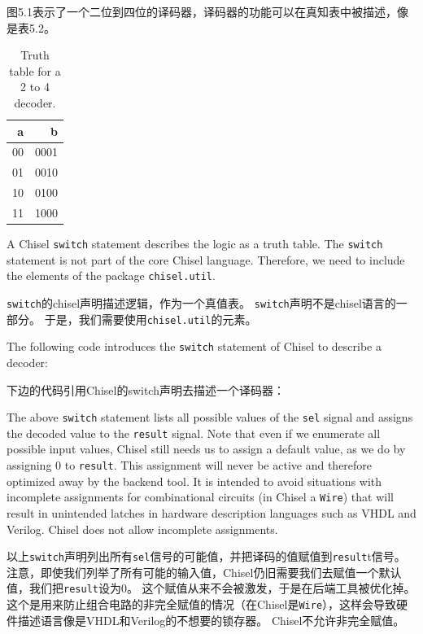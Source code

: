 \documentclass[%
    10pt,
    headinclude, footexclude,
    openright, %
    notitlepage,
    cleardoubleempty,
    headsepline,
    pointlessnumbers,
    bibtotoc, idxtotoc,
    ]{scrbook}
\newcommand{\code}[1]{{\small{\texttt{#1}}}}
\begin{document}
图5.1表示了一个二位到四位的译码器，译码器的功能可以在真知表中被描述，像是表5.2。

\begin{table}
 \centering
 \label{tab:decoder}
  \begin{tabular}{rr}
    \toprule
    a & b \\
    \midrule
    00 & 0001 \\
    01 & 0010 \\
    10 & 0100 \\
    11 & 1000 \\
    \bottomrule 
  \end{tabular} 
  \caption{Truth table for a 2 to 4 decoder.}
\end{table}

A Chisel \code{switch} statement describes the logic as a truth table.
The \code{switch} statement is not part of the core Chisel language.
Therefore, we need to include the elements of the package \code{chisel.util}.

\code{switch}的chisel声明描述逻辑，作为一个真值表。
\code{switch}声明不是chisel语言的一部分。
于是，我们需要使用\code{chisel.util}的元素。


\noindent The following code introduces the \code{switch} statement of Chisel to describe a decoder:

下边的代码引用Chisel的switch声明去描述一个译码器：


\noindent The above \code{switch} statement lists all possible values of the \code{sel} signal
and assigns the decoded value to the \code{result} signal.
Note that even if we enumerate all possible input values, Chisel still needs us to assign a
default value, as we do by assigning 0 to \code{result}.
This assignment will never be active and therefore optimized away by the backend tool.
It is intended to avoid situations with incomplete assignments for combinational circuits
(in Chisel a \code{Wire}) that will result in unintended latches in hardware description
languages such as VHDL and Verilog. Chisel does not allow incomplete assignments.

以上\code{switch}声明列出所有\code{sel}信号的可能值，并把译码的值赋值到\code{result}t信号。
注意，即使我们列举了所有可能的输入值，Chisel仍旧需要我们去赋值一个默认值，我们把\code{result}设为0。
这个赋值从来不会被激发，于是在后端工具被优化掉。
这个是用来防止组合电路的非完全赋值的情况（在Chisel是\code{Wire}），这样会导致硬件描述语言像是VHDL和Verilog的不想要的锁存器。
Chisel不允许非完全赋值。
\end{document}
